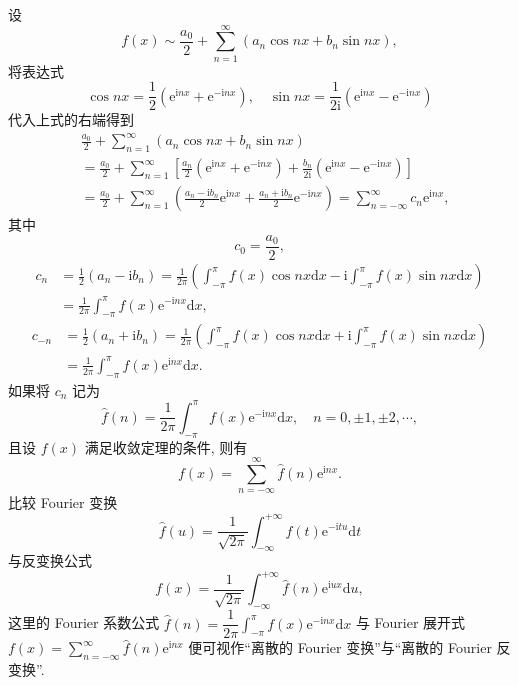 设
\[
  f(x)\sim\frac{a_{0}}{2}+\sum_{n=1}^{\infty}\left(a_{n}\cos nx+b_{n}\sin nx\right),
\]
将表达式
\[
  \cos nx=\frac{1}{2}\left(\mathrm{e}^{\mathrm{i}nx}+\mathrm{e}^{-\mathrm{i}nx}\right),\quad\sin nx=\frac{1}{2\mathrm{i}}\left(\mathrm{e}^{\mathrm{i}nx}-\mathrm{e}^{-\mathrm{i}nx}\right)
\]
代入上式的右端得到
\begin{align*}
  &\frac{a_{0}}{2}+\sum_{n=1}^{\infty}(a_{n}\cos nx+b_{n}\sin nx)\\
  &=\frac{a_{0}}{2}+\sum_{n=1}^{\infty}\left[\frac{a_{n}}{2}(\mathrm{e}^{\mathrm{i}nx}+\mathrm{e}^{-\mathrm{i}nx})+\frac{b_{n}}{2\mathrm{i}}(\mathrm{e}^{\mathrm{i}nx}-\mathrm{e}^{-\mathrm{i}nx})\right]\\
  &=\frac{a_{0}}{2}+\sum_{n=1}^{\infty}\left(\frac{a_{n}-\mathrm{i}b_{n}}{2}\mathrm{e}^{\mathrm{i}nx}+\frac{a_{n}+\mathrm{i}b_{n}}{2}\mathrm{e}^{-\mathrm{i}nx}\right)=\sum_{n=-\infty}^{\infty}c_{n}\mathrm{e}^{\mathrm{i}nx},
\end{align*}
其中
\[
  c_{0}=\frac{a_{0}}{2},
\]
\begin{align*}
  c_{n}&=\frac{1}{2}(a_{n}-\mathrm{i}b_{n})=\frac{1}{2\pi}\left(\int_{-\pi}^{\pi}f(x)\cos nx\mathrm{d}x-\mathrm{i}\int_{-\pi}^{\pi}f(x)\sin nx\mathrm{d}x\right)\\
  &=\frac{1}{2\pi}\int_{-\pi}^{\pi}f(x)\mathrm{e}^{-\mathrm{i}nx}\mathrm{d}x,
\end{align*}
\begin{align*}
  c_{-n}&=\frac{1}{2}(a_{n}+\mathrm{i}b_{n})=\frac{1}{2\pi}\left(\int_{-\pi}^{\pi}f(x)\cos nx\mathrm{d}x+\mathrm{i}\int_{-\pi}^{\pi}f(x)\sin nx\mathrm{d}x\right)\\
  &=\frac{1}{2\pi}\int_{-\pi}^{\pi}f(x)\mathrm{e}^{\mathrm{i}nx}\mathrm{d}x.
\end{align*}
如果将 $c_{n}$ 记为
\[
  \hat{f}(n)=\frac{1}{2\pi}\int_{-\pi}^{\pi}f(x)\mathrm{e}^{-\mathrm{i}nx}\mathrm{d}x,\quad n=0,\pm1,\pm2,\cdots,
\]
且设 $f(x)$ 满足收敛定理的条件, 则有
\[
  f(x)=\sum_{n=-\infty}^{\infty}\hat{f}(n)\mathrm{e}^{\mathrm{i}nx}.
\]
比较 Fourier 变换
\[
  \hat{f}(u)=\frac{1}{\sqrt{2\pi}}\int_{-\infty}^{+\infty}f(t)\mathrm{e}^{-\mathrm{i}tu}\mathrm{d}t
\]
与反变换公式
\[
  f(x)=\frac{1}{\sqrt{2\pi}}\int_{-\infty}^{+\infty}\hat{f}(n)\mathrm{e}^{\mathrm{i}ux}\mathrm{d}u,
\]
这里的 Fourier 系数公式 $\hat{f}(n)=\dfrac{1}{2\pi}\displaystyle\int_{-\pi}^{\pi}f(x)\mathrm{e}^{-\mathrm{i}nx}\mathrm{d}x$ 与 Fourier 展开式 $f(x)=\displaystyle\sum_{n=-\infty}^{\infty}\hat{f}(n)\mathrm{e}^{\mathrm{i}nx}$ 便可视作``离散的 Fourier 变换''与``离散的 Fourier 反变换''.

